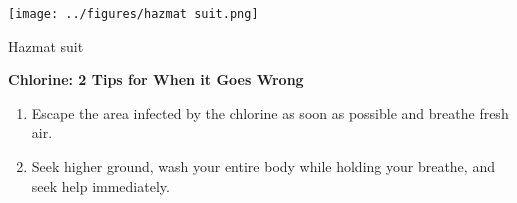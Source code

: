 \documentclass[working]{tuftebook}
\begin{document}
\begin{marginfigure}
    \centering
    \texttt{[image: ../figures/hazmat suit.png]}
    \caption{Hazmat suit}
    \label{fig:hazmat-suit}
\end{marginfigure}
\vspace{2em}

\textbf{Chlorine: 2 Tips for When it Goes Wrong}
\begin{enumerate}
   \item{Escape the area infected by the chlorine as soon as possible and breathe fresh air.}
   \item{Seek higher ground, wash your entire body while holding your breathe, and seek help immediately.}
\end{enumerate}
\end{document}
